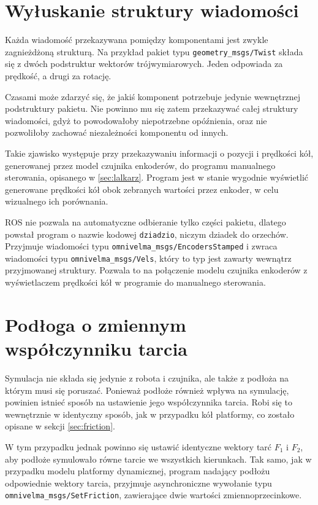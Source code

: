 \section{Wyłuskanie struktury wiadomości}
	\label{sec:dziadzio}
	Każda wiadomość przekazywana pomiędzy komponentami jest zwykle zagnieżdżoną strukturą.
	Na przykład pakiet typu \texttt{geometry\_msgs/Twist} składa się z dwóch podstruktur wektorów trójwymiarowych.
	Jeden odpowiada za prędkość, a drugi za rotację.
	
	Czasami może zdarzyć się, że jakiś komponent potrzebuje jedynie wewnętrznej podstruktury pakietu.
	Nie powinno mu się zatem przekazywać całej struktury wiadomości, gdyż to powodowałoby niepotrzebne opóźnienia, oraz nie pozwoliłoby zachować niezależności 
	komponentu od innych.
	
	Takie zjawisko występuje przy przekazywaniu informacji o pozycji i prędkości kół, generowanej przez model czujnika enkoderów, do programu
	manualnego sterowania, opisanego w \ref{sec:lalkarz}.
	Program jest w stanie wygodnie wyświetlić generowane prędkości kół obok zebranych wartości przez enkoder, w celu wizualnego ich porównania.
	
	ROS nie pozwala na automatyczne odbieranie tylko części pakietu, dlatego powstał program o nazwie kodowej \texttt{dziadzio}, niczym dziadek do orzechów.
	Przyjmuje wiadomości typu \texttt{omnivelma\_msgs/EncodersStamped} i zwraca wiadomości typu \texttt{omnivelma\_msgs/Vels}, który to typ 
	jest zawarty wewnątrz przyjmowanej struktury. Pozwala to na połączenie modelu czujnika enkoderów z wyświetlaczem prędkości kół w programie do manualnego sterowania.

\section{Podłoga o zmiennym współczynniku tarcia}
	\label{sec:flooria}
	Symulacja nie składa się jedynie z robota i czujnika, ale także z podłoża na którym musi się poruszać.
	Ponieważ podłoże również wpływa na symulację, powinien istnieć sposób na ustawienie jego współczynnika tarcia.
	Robi się to wewnętrznie w identyczny sposób, jak w przypadku kół platformy, co zostało opisane w sekcji \ref{sec:friction}.
	
	W tym przypadku jednak powinno się ustawić identyczne wektory tarć $F_1$ i $F_2$, aby podłoże symulowało równe tarcie we wszystkich kierunkach.
	Tak samo, jak w przypadku modelu platformy dynamicznej, program nadający podłożu odpowiednie wektory tarcia, przyjmuje asynchroniczne wywołanie 
	typu \texttt{omnivelma\_msgs/SetFriction}, zawierające dwie wartości zmiennoprzecinkowe.
	
